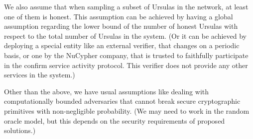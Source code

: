 We also assume that when sampling a subset of Ursulas in the network, 
at least one of them is honest. This assumption can be achieved by 
having a global assumption regarding the lower bound of the number of 
honest Ursulas with respect to the total number of Ursulas in the system. 
(Or it can be achieved by deploying a special entity like an external verifier, 
that changes on a periodic basis, or one by the NuCypher company, that is
trusted to faithfully participate in the confirm 
service activity protocol. This verifier does not provide any other services 
in the system.)


Other than the above, we have usual assumptions like dealing with 
computationally bounded adversaries 
that cannot break secure cryptographic primitives with non-negligible probability. 
(We may need to work in the random oracle model, but this depends on the 
security requirements of proposed solutions.)

